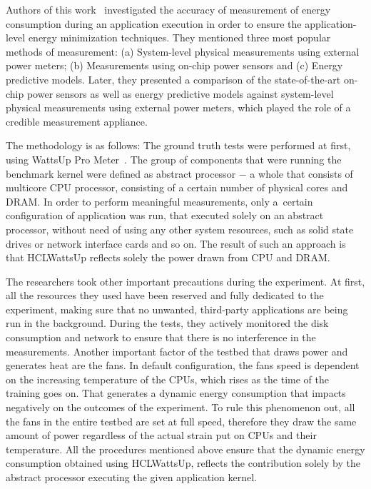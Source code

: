 Authors of this work~\cite{State_of_the_Art_Article_1}
investigated the accuracy of measurement of energy consumption
during an application execution in order to ensure the
application-level energy minimization techniques.
They mentioned three most popular methods of measurement:
(a) System-level physical measurements using external power meters;
(b) Measurements using on-chip power sensors and (c) Energy
predictive models. Later, they presented a comparison of the
state-of-the-art on-chip power sensors as well as energy
predictive models against system-level physical measurements
using external power meters, which played the role of a credible
measurement appliance.

The methodology is as follows: The ground truth tests were
performed at first, using WattsUp Pro
Meter~\cite{WattsUp_Quick_Reference_Guide}. The group of
components that were running the benchmark kernel were defined
as abstract processor $-$ a whole that consists of multicore CPU
processor, consisting of a certain number of physical cores and
DRAM\@. In order to perform meaningful measurements, only a~certain
configuration of application was run, that executed solely on an
abstract processor, without need of using any other system
resources, such as solid state drives or network interface cards
and so on. The result of such an approach is that HCLWattsUp
reflects solely the power drawn from CPU and DRAM\@.

The researchers took other important precautions during the
experiment. At first, all the resources they used have been
reserved and fully dedicated to the experiment, making sure
that no unwanted, third-party applications are being run in
the background. During the tests, they actively monitored the
disk consumption and network to ensure that there is no
interference in the measurements. Another important factor of
the testbed that draws power and generates heat are the fans.
In default configuration, the fans speed is dependent on the
increasing temperature of the CPUs, which rises as the time of
the training goes on. That generates a dynamic energy consumption
that impacts negatively on the outcomes of the experiment.
To rule this phenomenon out, all the fans in the entire testbed
are set at full speed, therefore they draw the same amount of
power regardless of the actual strain put on CPUs and their
temperature. All the procedures mentioned above ensure that the
dynamic energy consumption obtained using HCLWattsUp, reflects
the contribution solely by the abstract processor executing the
given application kernel.

